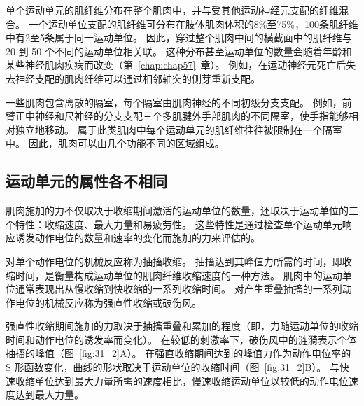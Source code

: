 单个运动单元的肌纤维分布在整个肌肉中，并与受其他运动神经元支配的纤维混合。
一个运动单位支配的肌纤维可分布在肢体肌肉体积的8\%至75\%，100条肌纤维中有2至5条属于同一运动单位。
因此，穿过整个肌肉中间的横截面中的肌纤维与 20 到 50 个不同的运动单位相关联。
这种分布甚至运动单位的数量会随着年龄和某些神经肌肉疾病而改变（第~\ref{chap:chap57}~章）。
例如，在运动神经元死亡后失去神经支配的肌肉纤维可以通过相邻轴突的侧芽重新支配。


一些肌肉包含离散的隔室，每个隔室由肌肉神经的不同初级分支支配。
例如，前臂正中神经和尺神经的分支支配三个多肌腱外手部肌肉的不同隔室，使手指能够相对独立地移动。
属于此类肌肉中每个运动单元的肌纤维往往被限制在一个隔室中。
因此，肌肉可以由几个功能不同的区域组成。



\subsection{运动单元的属性各不相同}

肌肉施加的力不仅取决于收缩期间激活的运动单位的数量，还取决于运动单位的三个特性：收缩速度、最大力量和易疲劳性。
这些特性是通过检查单个运动单元响应诱发动作电位的数量和速率的变化而施加的力来评估的。


对单个动作电位的机械反应称为抽搐收缩。
抽搐达到其峰值力所需的时间，即收缩时间，是衡量构成运动单位的肌肉纤维收缩速度的一种方法。
肌肉中的运动单位通常表现出从慢收缩到快收缩的一系列收缩时间。
对产生重叠抽搐的一系列动作电位的机械反应称为强直性收缩或破伤风。


强直性收缩期间施加的力取决于抽搐重叠和累加的程度（即，力随运动单位的收缩时间和动作电位的诱发率而变化）。
在较低的刺激率下，破伤风中的涟漪表示个体抽搐的峰值（图~\ref{fig:31_2}A）。 
在强直收缩期间达到的峰值力作为动作电位率的 S 形函数变化，曲线的形状取决于运动单位的收缩时间（图~\ref{fig:31_2}B）。
与快速收缩单位达到最大力量所需的速度相比，慢速收缩运动单位以较低的动作电位速度达到最大力量。


